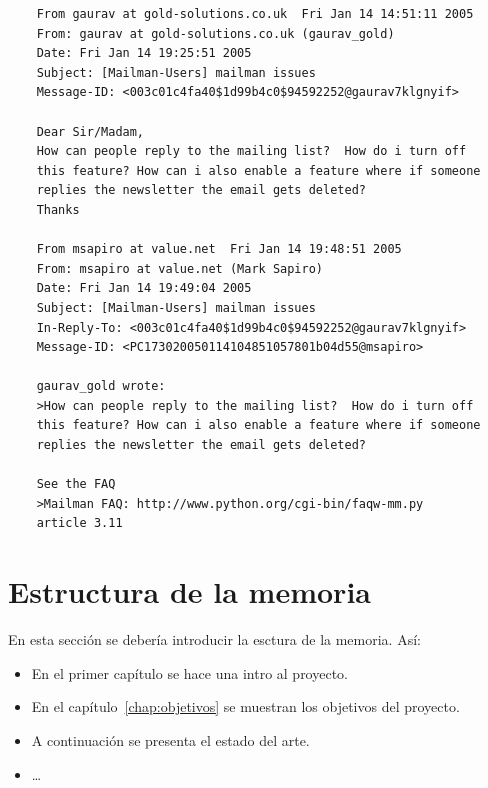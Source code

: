 \documentclass[a4paper, 12pt]{book}
\begin{document}
{\footnotesize
\begin{verbatim}
    From gaurav at gold-solutions.co.uk  Fri Jan 14 14:51:11 2005
    From: gaurav at gold-solutions.co.uk (gaurav_gold)
    Date: Fri Jan 14 19:25:51 2005
    Subject: [Mailman-Users] mailman issues
    Message-ID: <003c01c4fa40$1d99b4c0$94592252@gaurav7klgnyif>

    Dear Sir/Madam,
    How can people reply to the mailing list?  How do i turn off
    this feature? How can i also enable a feature where if someone
    replies the newsletter the email gets deleted?
    Thanks

    From msapiro at value.net  Fri Jan 14 19:48:51 2005
    From: msapiro at value.net (Mark Sapiro)
    Date: Fri Jan 14 19:49:04 2005
    Subject: [Mailman-Users] mailman issues
    In-Reply-To: <003c01c4fa40$1d99b4c0$94592252@gaurav7klgnyif>
    Message-ID: <PC173020050114104851057801b04d55@msapiro>

    gaurav_gold wrote:
    >How can people reply to the mailing list?  How do i turn off
    this feature? How can i also enable a feature where if someone
    replies the newsletter the email gets deleted?

    See the FAQ
    >Mailman FAQ: http://www.python.org/cgi-bin/faqw-mm.py
    article 3.11
\end{verbatim}
}

\section{Estructura de la memoria}
\label{sec:estructura}

En esta sección se debería introducir la esctura de la memoria. Así:

\begin{itemize}
  \item En el primer capítulo se hace una intro al proyecto.
  
  \item En el capítulo~\ref{chap:objetivos} se muestran los objetivos del proyecto.
  
  \item A continuación se presenta el estado del arte.
  
  \item \ldots
\end{itemize}



\end{document}
